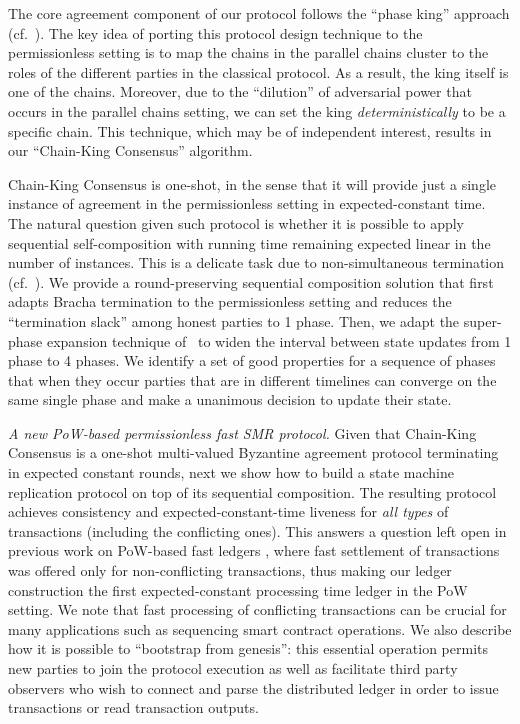 The core agreement component of our protocol follows the ``phase king'' approach (cf.~\cite{ALP:BerGar89,FOCS:BerGarPer89}).
%
The key idea of porting this protocol design technique to the permissionless setting is to map the chains in the parallel chains cluster to the roles of the different parties in the classical protocol.
%
As a result, the king itself is one of the chains.
%
Moreover, due to the ``dilution'' of adversarial power that occurs in the parallel chains setting, we can set the king \emph{deterministically} to be a specific chain.
%
This technique, which may be of independent interest, results in our ``Chain-King Consensus'' algorithm.

Chain-King Consensus is one-shot, in the sense that it will provide just a single instance of agreement in the permissionless setting in expected-constant time.
%
The natural question given such protocol is whether it is possible to apply sequential self-composition with running time remaining expected linear in the number of instances.
%
This is a delicate task due to non-simultaneous termination (cf.~\cite{C:CCGZ16}).
%
We provide a round-preserving sequential composition solution that first adapts Bracha termination \cite{PODC:Bracha84} to the permissionless setting and reduces the ``termination slack'' among honest parties to 1 phase.
%
Then, we adapt the super-phase expansion technique of~\cite{C:CCGZ16} to widen the interval between state updates from 1 phase to 4 phases.
%
We identify a set of good properties for a sequence of phases that when they occur parties that are in different timelines can converge on the same single phase and make a unanimous decision to update their state.

\smallskip\noindent\emph{A new PoW-based permissionless fast SMR protocol.}
%
Given that Chain-King Consensus is a one-shot multi-valued Byzantine agreement protocol terminating in expected constant rounds, next we show how to build a state machine replication protocol on top of its sequential composition.
%
The resulting protocol achieves consistency and expected-constant-time liveness for \emph{all types} of transactions (including the conflicting ones).
%
This answers a question left open in previous work on PoW-based fast ledgers \cite{CCS:BKTFV19,TCC:FGKR20}, where fast settlement of transactions was offered only for non-conflicting transactions, thus making our ledger construction the first expected-constant processing time ledger in the PoW setting.
%
We note that fast processing of conflicting transactions can be crucial for many applications such as sequencing smart contract operations.
%
We also describe how it is possible to ``bootstrap from genesis'': this essential operation permits new parties to join the protocol execution as well as facilitate third party observers who wish to connect and parse the distributed ledger in order to issue transactions or read transaction outputs.
